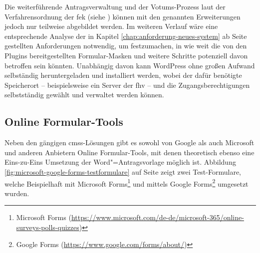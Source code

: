 \documentclass[a4paper,12pt,twoside]{scrreprt}
\begin{document}
Die weiterführende Antragsverwaltung und der Votums-Prozess laut der Verfahrensordnung der \ac{fek} (siehe \cite{forschungsethik-kommission_der_fachhochschule_vorarlberg_verfahrensordnung_2020}) können mit den genannten Erweiterungen jedoch nur teilweise abgebildet werden. Im weiteren Verlauf wäre eine entsprechende Analyse der in Kapitel \ref{chap:anforderung-neues-system} ab Seite \pageref{chap:anforderung-neues-system} gestellten Anforderungen notwendig, um festzumachen, in wie weit die von den Plugins bereitgestellten Formular-Masken und weitere Schritte potenziell davon betroffen sein könnten. Unabhängig davon kann WordPress ohne großen Aufwand selbständig heruntergeladen und installiert werden, wobei der dafür benötigte Speicherort -- beispielsweise ein Server der \acl{fhv} -- und die Zugangsberechtigungen selbstständig gewählt und verwaltet werden können.

\subsection{Online Formular-Tools}
\label{sub-sec:formular-tools}

Neben den gängigen \acp{cms}-Lösungen gibt es sowohl von Google als auch Microsoft und anderen Anbietern Online Formular-Tools, mit denen theoretisch ebenso eine Eins-zu-Eins Umsetzung der Word"=Antragsvorlage möglich ist. Abbildung \ref{fig:microsoft-google-forms-testformulare} auf Seite \pageref{fig:microsoft-google-forms-testformulare} zeigt zwei Test-Formulare, welche Beispielhaft mit  Microsoft Forms\footnote{Microsoft Forms (\url{https://www.microsoft.com/de-de/microsoft-365/online-surveys-polls-quizzes})} und mittels Google Forms\footnote{Google Forms (\url{https://www.google.com/forms/about/})} umgesetzt wurden.
\end{document}

